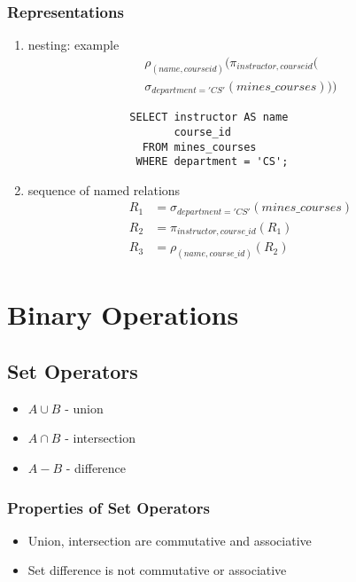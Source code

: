 \documentclass{../cheatsheet}
\begin{document}
\begin{multicols*}{2}
    \subsubsection{Representations}
    \begin{enumerate}
        \item nesting: example
            \begin{align*}
                \rho_{(name, courseid)}(\pi_{instructor, courseid}(\\\sigma_{department='CS'}(mines\_courses)))
            \end{align*}
            \begin{verbatim}
                SELECT instructor AS name
                       course_id
                  FROM mines_courses
                 WHERE department = 'CS';
            \end{verbatim}

        \item sequence of named relations
            \begin{align*}
                R_1 &= \sigma_{department='CS'}(mines\_courses)\\
                R_2 &= \pi_{instructor, course\_id}(R_1)\\
                R_3 &= \rho_{(name, course\_id)}(R_2)
            \end{align*}
    \end{enumerate}

    \section{Binary Operations}
    \subsection{Set Operators}
    \begin{itemize}
        \item $A \cup B$ - union
        \item $A \cap B$ - intersection
        \item $A - B$ - difference
    \end{itemize}

    \subsubsection{Properties of Set Operators}
    \begin{itemize}
        \item Union, intersection are commutative and associative
        \item Set difference is not commutative or associative
    \end{itemize}


\end{multicols*}
\end{document}
